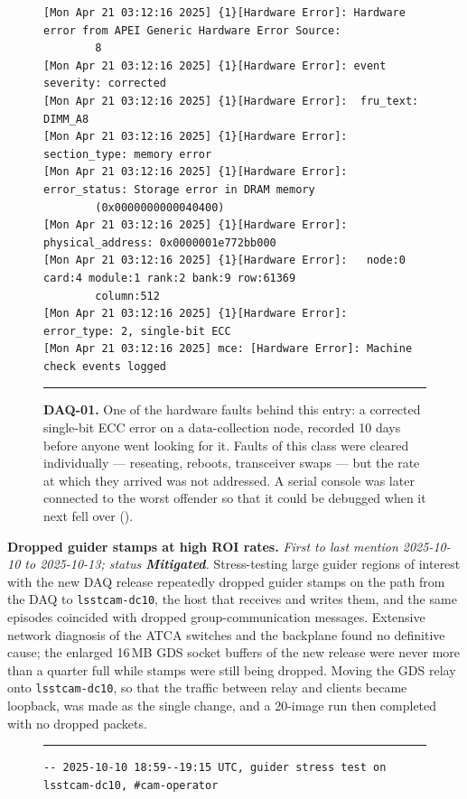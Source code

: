 \begin{description}
\begin{figure}[H]
\begin{minipage}{\textwidth}
\begin{verbatim}
[Mon Apr 21 03:12:16 2025] {1}[Hardware Error]: Hardware error from APEI Generic Hardware Error Source:
        8
[Mon Apr 21 03:12:16 2025] {1}[Hardware Error]: event severity: corrected
[Mon Apr 21 03:12:16 2025] {1}[Hardware Error]:  fru_text: DIMM_A8
[Mon Apr 21 03:12:16 2025] {1}[Hardware Error]:   section_type: memory error
[Mon Apr 21 03:12:16 2025] {1}[Hardware Error]:    error_status: Storage error in DRAM memory
        (0x0000000000040400)
[Mon Apr 21 03:12:16 2025] {1}[Hardware Error]:   physical_address: 0x0000001e772bb000
[Mon Apr 21 03:12:16 2025] {1}[Hardware Error]:   node:0 card:4 module:1 rank:2 bank:9 row:61369
        column:512
[Mon Apr 21 03:12:16 2025] {1}[Hardware Error]:   error_type: 2, single-bit ECC
[Mon Apr 21 03:12:16 2025] mce: [Hardware Error]: Machine check events logged
\end{verbatim}
\endgroup
\vspace{-10pt}\hrule
\end{minipage}
\caption{\textbf{DAQ-01.} One of the hardware faults behind this entry: a corrected single-bit ECC error on a data-collection node, recorded 10 days before anyone went looking for it.  Faults of this class were cleared individually --- reseating, reboots, transceiver swaps --- but the rate at which they arrived was not addressed.  A serial console was later connected to the worst offender so that it could be debugged when it next fell over ().}
\label{fig:iss-DAQ-01}
\end{figure}

\item[DAQ-02]\label{iss:DAQ-02} \textbf{Dropped guider stamps at high ROI rates.}
  \emph{First to last mention 2025-10-10 to 2025-10-13; status \textcolor{stmit}{\textbf{Mitigated}}.}
  Stress-testing large guider regions of interest with the new DAQ release repeatedly dropped guider stamps on the path from the DAQ to \texttt{lsstcam-dc10}, the host that receives and writes them, and the same episodes coincided with dropped group-communication messages.  Extensive network diagnosis of the ATCA switches and the backplane found no definitive cause; the enlarged 16\,MB GDS socket buffers of the new release were never more than a quarter full while stamps were still being dropped.  Moving the GDS relay onto \texttt{lsstcam-dc10}, so that the traffic between relay and clients became loopback, was made as the single change, and a 20-image run then completed with no dropped packets.

\begin{figure}[H]
\centering
\begin{minipage}{\textwidth}
\hrule\vspace{4pt}
\begingroup\scriptsize
\begin{verbatim}
-- 2025-10-10 18:59--19:15 UTC, guider stress test on lsstcam-dc10, #cam-operator


\end{verbatim}
\end{minipage}
\end{figure}
\end{description}
